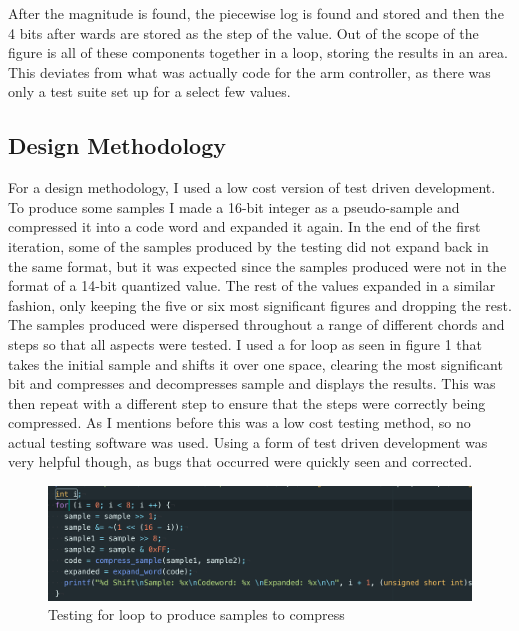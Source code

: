 \documentclass[12pt]{article}
\begin{document}
After the magnitude is found, the piecewise log is found and stored and then the 4 bits after wards are stored as the step of the value. Out of the scope of the figure is all of these components together in a loop, storing the results in an area. This deviates from what was actually code for the arm controller, as there was only a test suite set up for a select few values.

\subsection{Design Methodology}

For a design methodology, I used a low cost version of test driven development. To produce some samples I made a 16-bit integer as a pseudo-sample and compressed it into a code word and expanded it again. In the end of the first iteration, some of the samples produced by the testing did not expand back in the same format, but it was expected since the samples produced were not in the format of a 14-bit quantized value. The rest of the values expanded in a similar fashion, only keeping the five or six most significant figures and dropping the rest. The samples produced were dispersed throughout a range of different chords and steps so that all aspects were tested. I used a for loop as seen in figure 1 that takes the initial sample and shifts it over one space, clearing the most significant bit and compresses and decompresses sample and displays the results. This was then repeat with a different step to ensure that the steps were correctly being compressed. As I mentions before this was a low cost testing method, so no actual testing software was used. Using a form of test driven development was very helpful though, as bugs that occurred were quickly seen and corrected.\\

\begin{figure}[!h]
        \includegraphics[width=\textwidth]
        {testingLoop.png}
        \caption{\label{fig:test_loop} Testing for loop to produce samples to compress}
\end{figure}
\end{document}
